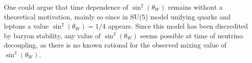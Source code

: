 One could argue that time dependence of  $\sin^2(\theta_W)$ remains without a theoretical
motivation, mainly so since in SU(5) model unifying  quarks and leptons a value
$\sin^2(\theta_W)=1/4$  appears. Since this model has been discredited by baryon stability, any
value of $\sin^2(\theta_W)$ seems possible at time of neutrino decoupling, as there is no known
rational for the observed   mixing value of $\sin^2(\theta_W)$.


